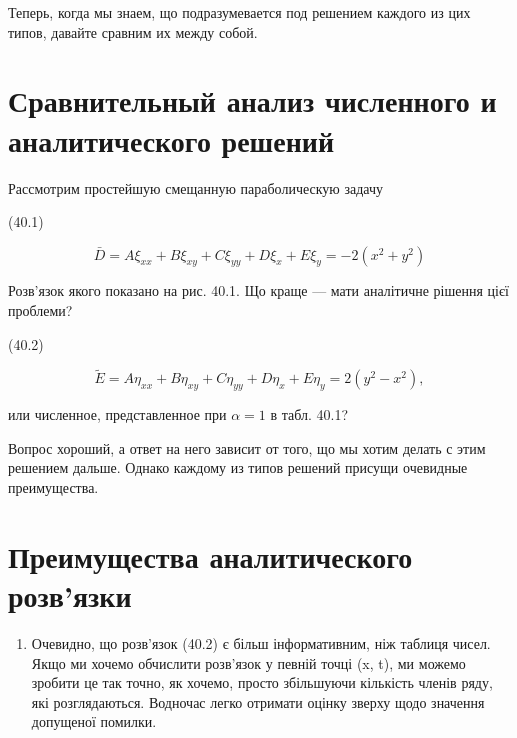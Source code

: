 \documentclass[
  ukrainian,
]{article}
\providecommand{\tightlist}{%
  \setlength{\itemsep}{0pt}\setlength{\parskip}{0pt}}
\begin{document}
Теперь, когда мы знаем, що подразумевается под решением каждого из цих
типов, давайте сравним их между собой.

\section{\texorpdfstring{\textbf{Сравнительный анализ численного} и
аналитического
решений}{Сравнительный анализ численного и аналитического решений}}\label{ux441ux440ux430ux432ux43dux438ux442ux435ux43bux44cux43dux44bux439-ux430ux43dux430ux43bux438ux437-ux447ux438ux441ux43bux435ux43dux43dux43eux433ux43e-ux438-ux430ux43dux430ux43bux438ux442ux438ux447ux435ux441ux43aux43eux433ux43e-ux440ux435ux448ux435ux43dux438ux439}

Рассмотрим простейшую смещанную параболическую задачу

(40.1)

\[
\bar{D} = A\xi_{xx} + B\xi_{xy} + C\xi_{yy} + D\xi_x + E\xi_y = -2(x^2 + y^2)
\]

Розв'язок якого показано на рис. 40.1. Що краще --- мати аналітичне
рішення цієї проблеми?

(40.2)

\[
\widetilde{E} = A\eta_{xx} + B\eta_{xy} + C\eta_{yy} + D\eta_x + E\eta_y = 2(y^2 - x^2),
\]

или численное, представленное при \(\alpha = 1\) в табл. 40.1?

Вопрос хороший, а ответ на него зависит от того, що мы хотим делать с
этим решением дальше. Однако каждому из типов решений присущи очевидные
преимущества.

\section{Преимущества аналитического
розв'язки}\label{ux43fux440ux435ux438ux43cux443ux449ux435ux441ux442ux432ux430-ux430ux43dux430ux43bux438ux442ux438ux447ux435ux441ux43aux43eux433ux43e-ux440ux43eux437ux432ux44fux437ux43aux438}

\begin{enumerate}
\def\labelenumi{\arabic{enumi}.}
\tightlist
\item
  Очевидно, що розв'язок (40.2) є більш інформативним, ніж таблиця
  чисел. Якщо ми хочемо обчислити розв'язок у певній точці (x, t), ми
  можемо зробити це так точно, як хочемо, просто збільшуючи кількість
  членів ряду, які розглядаються. Водночас легко отримати оцінку зверху
  щодо значення допущеної помилки.
\end{enumerate}
\end{document}
